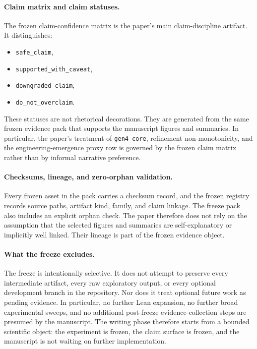 \documentclass[11pt]{article}
\theoremstyle{definition}
\begin{document}
\paragraph{Claim matrix and claim statuses.}
The frozen claim-confidence matrix is the paper's main claim-discipline artifact. It distinguishes:
\begin{itemize}
    \item \texttt{safe\_claim},
    \item \texttt{supported\_with\_caveat},
    \item \texttt{downgraded\_claim},
    \item \texttt{do\_not\_overclaim}.
\end{itemize}
These statuses are not rhetorical decorations. They are generated from the same frozen evidence pack that supports the manuscript figures and summaries. In particular, the paper's treatment of \texttt{gen4\_core}, refinement non-monotonicity, and the engineering-emergence proxy row is governed by the frozen claim matrix rather than by informal narrative preference.

\paragraph{Checksums, lineage, and zero-orphan validation.}
Every frozen asset in the pack carries a checksum record, and the frozen registry records source paths, artifact kind, family, and claim linkage. The freeze pack also includes an explicit orphan check. The paper therefore does not rely on the assumption that the selected figures and summaries are self-explanatory or implicitly well linked. Their lineage is part of the frozen evidence object.

\paragraph{What the freeze excludes.}
The freeze is intentionally selective. It does not attempt to preserve every intermediate artifact, every raw exploratory output, or every optional development branch in the repository. Nor does it treat optional future work as pending evidence. In particular, no further Lean expansion, no further broad experimental sweeps, and no additional post-freeze evidence-collection steps are presumed by the manuscript. The writing phase therefore starts from a bounded scientific object: the experiment is frozen, the claim surface is frozen, and the manuscript is not waiting on further implementation.
\end{document}
